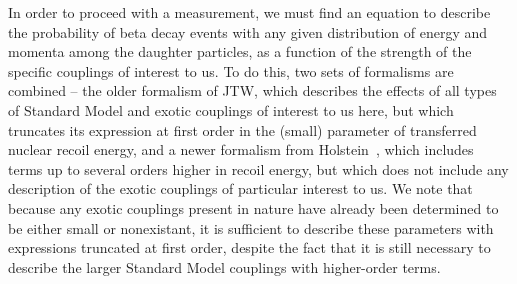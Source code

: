 	In order to proceed with a measurement, we must find an equation to describe the probability of beta decay events with any given distribution of energy and momenta among the daughter particles, as a function of the strength of the specific couplings of interest to us.  To do this, two sets of formalisms are combined -- the older formalism of JTW, %
which describes the effects of all types of Standard Model and exotic couplings of interest to us here, but which truncates its expression at first order in the (small) parameter of transferred nuclear recoil energy, and a newer formalism from Holstein~\cite{holstein}, which includes terms up to several orders higher in recoil energy, but which does not include any description of the exotic couplings of particular interest to us.  We note that because any exotic couplings present in nature have already been determined to be either small or nonexistant, it is sufficient to describe these parameters with expressions truncated at first order, despite the fact that it is still necessary to describe the larger Standard Model couplings with higher-order terms. 

	
